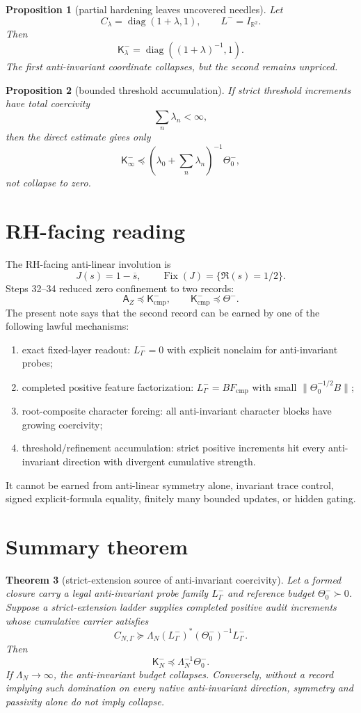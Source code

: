 \documentclass[11pt]{article}
\newtheorem{theorem}{Theorem}
\newtheorem{proposition}[theorem]{Proposition}
\DeclareMathOperator{\Fix}{Fix}
\begin{document}
\begin{proposition}[partial hardening leaves uncovered needles]
Let
\[
  C_\lambda=\operatorname{diag}(1+\lambda,1),
  \qquad L^-=I_{\mathbb R^2}.
\]
Then
\[
  \mathsf K^-_\lambda=\operatorname{diag}((1+\lambda)^{-1},1).
\]
The first anti-invariant coordinate collapses, but the second remains unpriced.
\end{proposition}

\begin{proposition}[bounded threshold accumulation]
If strict threshold increments have total coercivity
\[
  \sum_n\lambda_n<\infty,
\]
then the direct estimate gives only
\[
  \mathsf K^-_\infty\preceq \left(\lambda_0+\sum_n\lambda_n\right)^{-1}\Theta^-_0,
\]
not collapse to zero.
\end{proposition}

\section{RH-facing reading}
The RH-facing anti-linear involution is
\[
  J(s)=1-\overline{s},
  \qquad \Fix(J)=\{\Re(s)=1/2\}.
\]
Steps 32--34 reduced zero confinement to two records:
\[
  \mathsf A_Z\preceq \mathsf K^-_{\mathrm{cmp}},
  \qquad
  \mathsf K^-_{\mathrm{cmp}}\preceq \Theta^-.
\]
The present note says that the second record can be earned by one of the following lawful mechanisms:
\begin{enumerate}[label=(\roman*)]
\item exact fixed-layer readout: \(L^-_\Gamma=0\) with explicit nonclaim for anti-invariant probes;
\item completed positive feature factorization: \(L^-_\Gamma=BF_{\mathrm{cmp}}\) with small \(\|\Theta_0^{-1/2}B\|\);
\item root-composite character forcing: all anti-invariant character blocks have growing coercivity;
\item threshold/refinement accumulation: strict positive increments hit every anti-invariant direction with divergent cumulative strength.
\end{enumerate}
It cannot be earned from anti-linear symmetry alone, invariant trace control, signed explicit-formula equality, finitely many bounded updates, or hidden gating.

\section{Summary theorem}
\begin{theorem}[strict-extension source of anti-invariant coercivity]
Let a formed closure carry a legal anti-invariant probe family \(L^-_\Gamma\) and reference budget \(\Theta^-_0\succ0\).  Suppose a strict-extension ladder supplies completed positive audit increments whose cumulative carrier satisfies
\[
  C_{N,\Gamma}\succeq \Lambda_N (L^-_\Gamma)^*(\Theta^-_0)^{-1}L^-_\Gamma.
\]
Then
\[
  \mathsf K^-_N\preceq \Lambda_N^{-1}\Theta^-_0.
\]
If \(\Lambda_N\to\infty\), the anti-invariant budget collapses.  Conversely, without a record implying such domination on every native anti-invariant direction, symmetry and passivity alone do not imply collapse.
\end{theorem}
\end{document}
